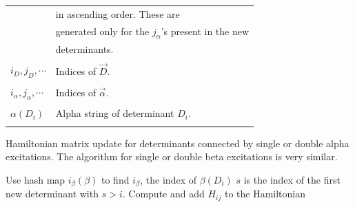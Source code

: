 \documentclass[%
preprint,
 superscriptaddress,
 amsmath,amssymb,
 aps,
]{revtex4-1}
\def\vecD{\vec{D}}
\def\veca{\vec{\alpha}}
\def\vecb{\vec{\beta}}
\def\ia{i_\alpha}
\def\ib{i_\beta}
\def\veciDb{\vec{i}_{D\beta}}
\begin{document}
\begin{table}[h]
\begin{tabular}{ll}
& in ascending order. These are \\
& generated only for the $j_\alpha$'s present in the new \\
& determinants.\\
&\\
$i_D, j_D, \cdots$ & Indices of $\vecD$.\\
&\\
$\ia, j_\alpha, \cdots$ & Indices of $\veca$.\\
&\\
$\alpha(D_i)$ & Alpha string of determinant $D_i$.\\
&\\
\hline
\end{tabular}
\label{auxiliary}
\end{table}


\begin{algorithm}
\caption{Hamiltonian matrix update for determinants connected by single or double alpha excitations.
The algorithm for single or double beta excitations is very similar.
}
\begin{algorithmic}
\FOR{$D_i$ in $\vecD$}
  \State Use hash map $\ib(\beta)$ to find $\ib$, the index of $\beta(D_i)$
  \State $s$ is the index of the first new determinant with $s > i$.
  \FOR{$j$ in $\veciDb(\ib)$}
    \State Compute and add $H_{ij}$ to the Hamiltonian
  \ENDIF
  \ENDFOR
\ENDFOR
\end{algorithmic}
\label{same_spin}
\vskip 7mm
\end{algorithm}
\end{document}
